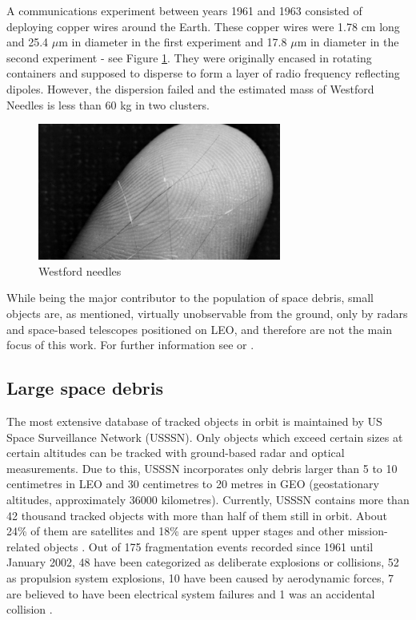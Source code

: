 	A communications experiment between years 1961 and 1963 consisted of deploying copper wires around the Earth. These copper wires were 1.78 cm long and 25.4 $\mu$m in diameter in the first experiment and 17.8 $\mu$m in diameter in the second experiment - see Figure \ref{fig:westfordneedles}. They were originally encased in rotating containers and supposed to disperse to form a layer of radio frequency reflecting dipoles. However, the dispersion failed and the estimated mass of Westford Needles is less than 60 kg in two clusters.
	
\begin{figure}[H]
\centering
  \includegraphics[width=8cm]{images/westfordneedles}
  \caption{Westford needles}
  \label{fig:westfordneedles}
\end{figure}	
	
	While being the major contributor to the population of space debris, small objects are, as mentioned, virtually unobservable from the ground, only by radars and space-based telescopes positioned on LEO, and therefore are not the main focus of this work. For further information see \citep{klinkrad2006space} or \citep{Silha2012id}.

\subsection{Large space debris}\label{subsec:large_space_debris}

	The most extensive database of tracked objects in orbit is maintained by US Space Surveillance Network (USSSN). Only objects which exceed certain sizes at certain altitudes can be tracked with ground-based radar and optical measurements. Due to this, USSSN incorporates only debris larger than 5 to 10 centimetres in LEO and 30 centimetres to 20 metres in GEO (geostationary altitudes, approximately 36000 kilometres). Currently, USSSN contains more than 42 thousand tracked objects with more than half of them still in orbit. About 24\% of them are satellites and 18\% are spent upper stages and other mission-related objects \citep{esabr336}. Out of 175 fragmentation events recorded since 1961 until January 2002, 48 have been categorized as deliberate explosions or collisions, 52 as propulsion system explosions, 10 have been caused by aerodynamic forces, 7 are believed to have been electrical system failures and 1 was an accidental collision \citep{klinkrad2006space}. 

